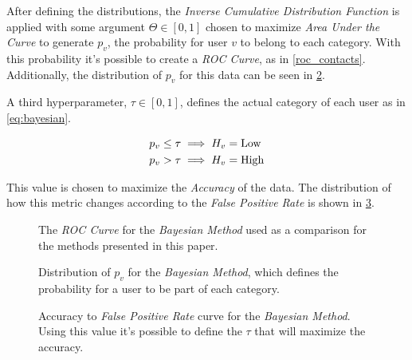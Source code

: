 After defining the distributions, the \emph{Inverse Cumulative Distribution Function} is applied with some argument $\Theta \in \left[ 0, 1 \right]$ chosen to maximize \emph{Area Under the Curve} to generate $p_v$, the probability for user $v$ to belong to each category. With this probability it's possible to create a \emph{ROC Curve}, as in \cref{roc_contacts}. Additionally, the distribution of $p_v$ for this data can be seen in \cref{fig:hist_contacts}.

A third hyperparameter, $\tau \in \left[ 0, 1 \right]$, defines the actual category of each user as in \cref{eq:bayesian}.

\begin{equation}
\label{eq:bayesian}
\begin{aligned}
	p_v \leq \tau &\implies H_v = \operatorname{Low} \\
	p_v > \tau &\implies H_v = \operatorname{High}
\end{aligned}
\end{equation}

This value is chosen to maximize the \emph{Accuracy} of the data. The distribution of how this metric changes according to the \emph{False Positive Rate} is shown in \cref{fig:accuracy_contacts}.

\begin{figure}
\centering
{}
\caption{The \emph{ROC Curve} for the \emph{Bayesian Method} used as a comparison for the methods presented in this paper.}
\label{fig:roc_contacts}
\end{figure}

\begin{figure}
\centering
{}
\caption{Distribution of $p_v$ for the \emph{Bayesian Method}, which defines the probability for a user to be part of each category.}
\label{fig:hist_contacts}
\end{figure}

\begin{figure}
\centering
{}
\caption{Accuracy to \emph{False Positive Rate} curve for the \emph{Bayesian Method}. Using this value it's possible to define the $\tau$ that will maximize the accuracy.}
\label{fig:accuracy_contacts}
\end{figure}

